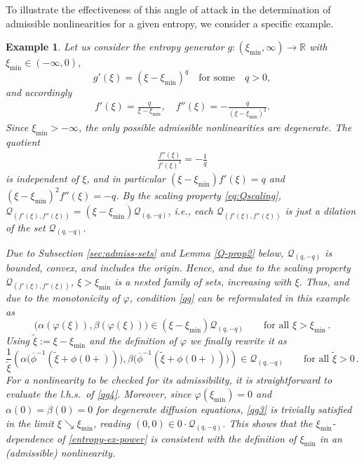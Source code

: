 \documentclass[reqno]{amsart}
\newtheorem{example}[lemma]{Example}
\newcommand{\R}{\mathbb{R}}
\newcommand{\Q}{{\mathcal{Q}}}
\begin{document}
To illustrate the effectiveness of this angle of attack in the determination of admissible nonlinearities for a given entropy, we consider a specific example.
%
\begin{example} \label{entropydeg}
  Let us consider the entropy generator $g:(\xi_{\min},\infty)\to\R$ with $\xi_{\min}\in(-\infty,0)$,  
\begin{equation}\label{entropy-ex-power}
  g'(\xi)=(\xi-\xi_{\min})^q\quad \mbox{for some} \quad q>0, 
\end{equation}
  and accordingly
  \begin{align*}
    f'(\xi) = \frac q{\xi-\xi_{\min}},
    \quad
    f''(\xi) = -\frac q{(\xi-\xi_{\min})^2}.
  \end{align*}
Since $\xi_{\min}>-\infty$, the only possible admissible nonlinearities are degenerate.  
  The quotient
  \begin{align*}
    \frac{f''(\xi)}{f'(\xi)^2} = -\frac1q
  \end{align*}
  is independent of $\xi$,
  and in particular $(\xi-\xi_{\min}) f'(\xi)=q$ and $(\xi-\xi_{\min})^2f''(\xi)=-q$.
  By the scaling property \eqref{eq:Qscaling},
  $\mathcal Q_{(f'(\xi),f''(\xi))}=(\xi-\xi_{\min})\mathcal Q_{(q,-q)}$, i.e.,
  each $\mathcal Q_{(f'(\xi),f''(\xi))}$ is just a dilation of the set $\mathcal Q_{(q,-q)}$.

Due to Subsection \ref{sec:admiss-sets} and Lemma \ref{Q-prop2} below, $\Q_{(q,-q)}$ is bounded, convex, and includes the origin. 
Hence, and due to the scaling property $\mathcal Q_{(f'(\xi),f''(\xi))}$, $\xi>\xi_{\min}$ is a nested family of sets, increasing with $\xi$. Thus, and due to the monotonicity of $\varphi$, condition \eqref{qg} can be reformulated in this example as
\begin{equation}\label{qg3}
 \big(\alpha(\varphi(\xi)),\beta(\varphi(\xi))\big)\in(\xi-\xi_{\min})\mathcal Q_{(q,-q)} \qquad \mbox{for all } \xi>\xi_{\min}\,. 
\end{equation}
Using $\tilde \xi:=\xi-\xi_{\min}$ and the definition of $\varphi$ we finally rewrite it as
\begin{equation}\label{qg4}
 \frac{1}{\tilde\xi}\left(\alpha\big(\overline{\phi}^{-1}(\tilde\xi+\phi(0+))\big),\beta\big(\overline{\phi}^{-1}(\tilde\xi+\phi(0+))\big)\right)\in\mathcal Q_{(q,-q)} \qquad \mbox{for all } \tilde\xi>0\,. 
\end{equation}
For a nonlinearity to be checked for its admissibility, it is straightforward to evaluate the l.h.s.\ of \eqref{qg4}. Moreover, since $\varphi(\xi_{\min})=0$ and $\alpha(0)=\beta(0)=0$ for degenerate diffusion equations, \eqref{qg3} is trivially satisfied in the limit $\xi\searrow\xi_{\min}$, reading  $(0,0)\in 0\cdot\Q_{(q,-q)}$. This shows that the  $\xi_{\min}$-dependence of \eqref{entropy-ex-power} is consistent with the definition of $\xi_{\min}$ in an (admissible) nonlinearity.\\


\end{example}
\end{document}
